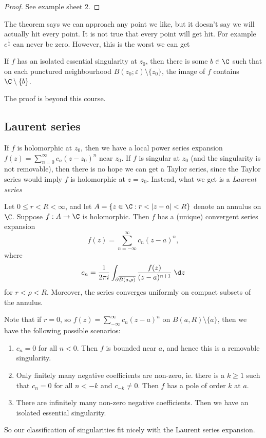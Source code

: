 \documentclass[a4paper]{article}
\begin{document}
\begin{proof}
  See example sheet 2.
\end{proof}

The theorem says we can approach any point we like, but it doesn't say we will actually hit every point. It is not true that every point will get hit. For example $e^{\frac{1}{z}}$ can never be zero. However, this is the worst we can get

\begin{thm}
  If $f$ has an isolated essential singularity at $z_0$, then there is some $b \in \C$ such that on each punctured neighbourhood $B(z_0; \varepsilon)\setminus \{z_0\}$, the image of $f$ contains $\C\setminus \{b\}$.
\end{thm}
The proof is beyond this course.

\subsection{Laurent series}
If $f$ is holomorphic at $z_0$, then we have a local power series expansion $f(z) = \sum_{n = 0}^\infty c_n (z - z_0)^n$ near $z_0$. If $f$ is singular at $z_0$ (and the singularity is not removable), then there is no hope we can get a Taylor series, since the Taylor series would imply $f$ is holomorphic at $z = z_0$. Instead, what we get is a \emph{Laurent series}

\begin{thm}
  Let $0 \leq r < R < \infty$, and let $A = \{z \in \C: r < |z - a| < R\}$ denote an annulus on $\C$. Suppose $f: A \to \C$ is holomorphic. Then $f$ has a (unique) convergent series expansion
  \[
    f(z) = \sum_{n = -\infty}^\infty c_n (z - a)^n,
  \]
  where
  \[
    c_n = \frac{1}{2\pi i} \int_{\partial \overline{B(a, \rho)}} \frac{f(z)}{(z - a)^{n + 1}}\;\d z
  \]
  for $r < \rho < R$. Moreover, the series converges uniformly on compact subsets of the annulus.
\end{thm}

Note that if $r = 0$, so $f(z) = \sum_{-\infty}^\infty c_n (z - a)^n$ on $B(a, R) \setminus \{a\}$, then we have the following possible scenarios:
\begin{enumerate}
  \item $c_n = 0$ for all $n < 0$. Then $f$ is bounded near $a$, and hence this is a removable singularity.
  \item Only finitely many negative coefficients are non-zero, ie. there is a $k \geq 1$ such that $c_n = 0$ for all $n < -k$ and $c_{-k} \not= 0$. Then $f$ has a pole of order $k$ at $a$.
  \item There are infinitely many non-zero negative coefficients. Then we have an isolated essential singularity.
\end{enumerate}
So our classification of singularities fit nicely with the Laurent series expansion.
\end{document}
